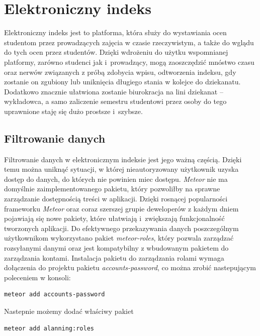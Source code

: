 \documentclass[openright]{xmgr}
\begin{document}
\chapter{Elektroniczny indeks}
\indent \indent \indent Elektroniczny indeks jest to platforma, która służy do wystawiania ocen studentom przez prowadzących zajęcia w czasie rzeczywistym, a także do wglądu do tych ocen przez studentów. Dzięki wdrożeniu do użytku wspomnianej platformy, zarówno studenci jak i~prowadzący, mogą zaoszczędzić mnóstwo czasu oraz nerwów związanych z próbą zdobycia wpisu, odtworzenia indeksu, gdy zostanie on zgubiony lub uniknięcia długiego stania w kolejce do dziekanatu. Dodatkowo znacznie ułatwiona zostanie biurokracja na lini dziekanat -- wykładowca, a samo zaliczenie semestru studentowi przez osoby do tego uprawnione staję się dużo prostsze i~szybsze.

\section{Filtrowanie danych}

\indent \indent \indent Filtrowanie danych w elektronicznym indeksie jest jego ważną częścią. Dzięki temu można uniknąć sytuacji, w której nieautoryzowany użytkownik uzyska dostęp do danych, do których nie powinien miec dostępu. \textit{Meteor} nie ma domyślnie zaimplementowanego pakietu, który pozwoliłby na sprawne zarządzanie dostępnością treści w aplikacji.  Dzięki rosnącej popularności frameworku \textit{Meteor} oraz coraz szerszej grupie deweloperów z każdym dniem pojawiają się nowe pakiety, które ułatwiają i~zwiększają funkcjonalność tworzonych aplikacji. Do efektywnego przekazywania danych poszczególnym użytkownikom wykorzystano pakiet \textit{meteor-roles}, który pozwala zarządzać rozsyłanymi danymi oraz jest kompatybilny z wbudowanym pakietem do zarządzania kontami. Instalacja pakietu do zarządzania rolami wymaga dołączenia do projektu pakietu \textit{accounts-password}, co można zrobić nastepującym poleceniem w konsoli:
\newpage
\begin{lstlisting}[language=bash,caption={Instalacja accounts-password}]
	meteor add accounts-password
\end{lstlisting}

Nastepnie możemy dodać właściwy pakiet

\begin{lstlisting}[language=bash,caption={Instalacja pakietu roles}]
	meteor add alanning:roles
\end{lstlisting}
\end{document}
